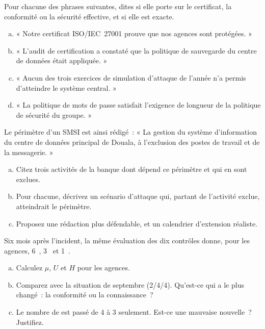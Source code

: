 \begin{boxexo}[title={\ding{45}\quad Exercice~P.1. Certificat, conformité ou sécurité~? \niveaubase}]
Pour chacune des phrases suivantes, dites si elle porte sur le certificat,
la conformité ou la sécurité effective, et si elle est exacte.
\begin{enumerate}[(a)]
    \item « Notre certificat ISO/IEC~27001 prouve que nos agences sont
          protégées. »
    \item « L'audit de certification a constaté que la politique de sauvegarde
          du centre de données était appliquée. »
    \item « Aucun des trois exercices de simulation d'attaque de l'année n'a
          permis d'atteindre le système central. »
    \item « La politique de mots de passe satisfait l'exigence de longueur de
          la politique de sécurité du groupe. »
\end{enumerate}
\end{boxexo}

\begin{boxexo}[title={\ding{45}\quad Exercice~P.2. Lire un périmètre \niveaumoyen}]
Le périmètre d'un SMSI est ainsi rédigé~: « La gestion du système
d'information du centre de données principal de Douala, à l'exclusion des
postes de travail et de la messagerie. »
\begin{enumerate}[(a)]
    \item Citez trois activités de la banque dont dépend ce périmètre et qui
          en sont exclues.
    \item Pour chacune, décrivez un scénario d'attaque qui, partant de
          l'activité exclue, atteindrait le périmètre.
    \item Proposez une rédaction plus défendable, et un calendrier
          d'extension réaliste.
\end{enumerate}
\end{boxexo}

\begin{boxexo}[title={\ding{45}\quad Exercice~P.3. Mesurer deux périmètres \niveaumoyen}]
Six mois après l'incident, la même évaluation des dix contrôles donne, pour
les agences, 6~\OUI{}, 3~\NON{} et 1~\NEK{}.
\begin{enumerate}[(a)]
    \item Calculez $\mu$, $U$ et $H$ pour les agences.
    \item Comparez avec la situation de septembre (2/4/4). Qu'est-ce qui a
          le plus changé~: la conformité ou la connaissance~?
    \item Le nombre de \NON{} est passé de 4 à 3 seulement. Est-ce une
          mauvaise nouvelle~? Justifiez.
\end{enumerate}
\end{boxexo}

